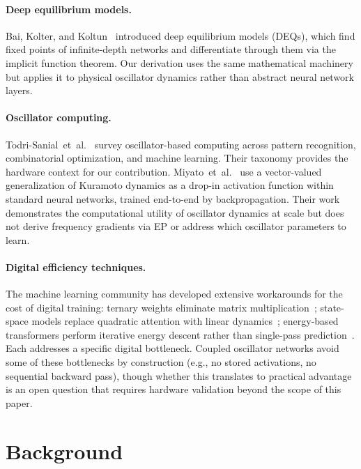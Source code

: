 \documentclass[11pt,a4paper]{article}
\begin{document}
\paragraph{Deep equilibrium models.}
Bai, Kolter, and Koltun~\citeyearpar{bai2019deep} introduced deep equilibrium
models (DEQs), which find fixed points of infinite-depth networks and
differentiate through them via the implicit function theorem. Our
derivation uses the same mathematical machinery but applies it to physical
oscillator dynamics rather than abstract neural network layers.

\paragraph{Oscillator computing.}
Todri-Sanial~et~al.~\citeyearpar{todrisanial2024computing} survey oscillator-based
computing across pattern recognition, combinatorial optimization, and
machine learning. Their taxonomy provides the hardware context for our
contribution. Miyato~et~al.~\citeyearpar{miyato2025akorn} use a vector-valued
generalization of Kuramoto dynamics as a drop-in activation function within
standard neural networks, trained end-to-end by backpropagation. Their work
demonstrates the computational utility of oscillator dynamics at scale but
does not derive frequency gradients via EP or address which oscillator
parameters to learn.

\paragraph{Digital efficiency techniques.}
The machine learning community has developed extensive workarounds for the
cost of digital training: ternary weights eliminate matrix
multiplication~\citep{ma2024era}; state-space models replace quadratic
attention with linear dynamics~\citep{gu2023mamba}; energy-based
transformers perform iterative energy descent rather than single-pass
prediction~\citep{gladstone2025energy}. Each addresses a specific digital
bottleneck. Coupled oscillator networks avoid some of these bottlenecks by
construction (e.g., no stored activations, no sequential backward pass),
though whether this translates to practical advantage is an open question
that requires hardware validation beyond the scope of this paper.

\section{Background}
\label{sec:background}
\end{document}
